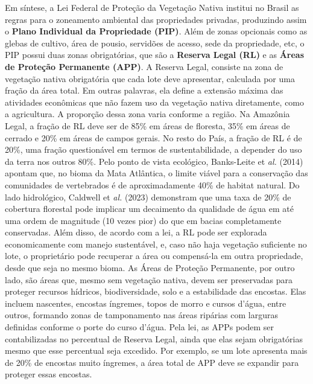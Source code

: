 \documentclass[./main.tex]{subfiles}
\begin{document}
\par Em síntese, a Lei Federal de Proteção da Vegetação Nativa institui no Brasil as regras para o zoneamento ambiental das propriedades privadas, produzindo assim o \textbf{Plano Individual da Propriedade (PIP)}. Além de zonas opcionais como as glebas de cultivo, área de pousio, servidões de acesso, sede da propriedade, etc, o PIP possui duas zonas obrigatórias, que são a \textbf{Reserva Legal (RL)} e as \textbf{Áreas de Proteção Permanente (APP)}. A Reserva Legal, consiste na zona de vegetação nativa obrigatória que cada lote deve apresentar, calculada por uma fração da área total. Em outras palavras, ela define a extensão máxima das atividades econômicas que não fazem uso da vegetação nativa diretamente, como a agricultura. A proporção dessa zona varia conforme a região. Na Amazônia Legal, a fração de RL deve ser de 85\% em áreas de floresta, 35\% em áreas de cerrado e 20\% em áreas de campos gerais. No resto do País, a fração de RL é de 20\%, uma fração questionável em termos de sustentabilidade, a depender do uso da terra nos outros 80\%. Pelo ponto de vista ecológico, Banks-Leite et \textit{al.} (2014) \cite{Banks-leite2014a} apontam que, no bioma da Mata Atlântica, o limite viável para a conservação das comunidades de vertebrados é de aproximadamente 40\% de habitat natural. Do lado hidrológico, Caldwell et \textit{al.} (2023) \cite{Caldwell2023} demonstram que uma taxa de 20\% de cobertura florestal pode implicar um decaimento da qualidade de água em até uma ordem de magnitude (10 vezes pior) do que em bacias completamente conservadas. Além disso, de acordo com a lei, a RL pode ser explorada economicamente com manejo sustentável, e, caso não haja vegetação suficiente no lote, o proprietário pode recuperar a área ou compensá-la em outra propriedade, desde que seja no mesmo bioma. As Áreas de Proteção Permanente, por outro lado, são áreas que, mesmo sem vegetação nativa, devem ser preservadas para proteger recursos hídricos, biodiversidade, solo e a estabilidade das encostas. Elas incluem nascentes, encostas íngremes, topos de morro e cursos d'água, entre outros, formando zonas de tamponamento nas áreas ripárias com larguras definidas conforme o porte do curso d'água. Pela lei, as APPs podem ser contabilizadas no percentual de Reserva Legal, ainda que elas sejam obrigatórias mesmo que esse percentual seja excedido. Por exemplo, se um lote apresenta mais de 20\% de encostas muito íngremes, a área total de APP deve se expandir para proteger essas encostas.
\end{document}
